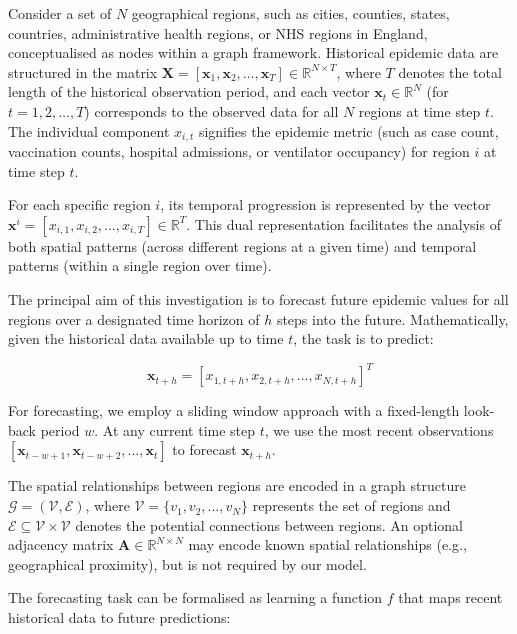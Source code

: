 \documentclass[a4paper,fleqn]{cas-dc}
\begin{document}
Consider a set of $N$ geographical regions, such as cities, counties, states, countries, administrative health regions, or NHS regions in England, conceptualised as nodes within a graph framework. Historical epidemic data are structured in the matrix $\mathbf{X} = [\mathbf{x}_1, \mathbf{x}_2, \ldots, \mathbf{x}_T] \in \mathbb{R}^{N \times T}$, where $T$ denotes the total length of the historical observation period, and each vector $\mathbf{x}_t \in \mathbb{R}^N$ (for $t = 1, 2, \ldots, T$) corresponds to the observed data for all $N$ regions at time step $t$. The individual component $x_{i,t}$ signifies the epidemic metric (such as case count, vaccination counts, hospital admissions, or ventilator occupancy) for region $i$ at time step $t$.

For each specific region $i$, its temporal progression is represented by the vector $\mathbf{x}^i = [x_{i,1}, x_{i,2}, \ldots, x_{i,T}] \in \mathbb{R}^T$. This dual representation facilitates the analysis of both spatial patterns (across different regions at a given time) and temporal patterns (within a single region over time).

The principal aim of this investigation is to forecast future epidemic values for all regions over a designated time horizon of $h$ steps into the future. Mathematically, given the historical data available up to time $t$, the task is to predict:

\begin{equation}
\mathbf{x}_{t+h} = [x_{1,t+h}, x_{2,t+h}, \ldots, x_{N,t+h}]^T
\end{equation}

For forecasting, we employ a sliding window approach with a fixed-length look-back period $w$. At any current time step $t$, we use the most recent observations $[\mathbf{x}_{t-w+1}, \mathbf{x}_{t-w+2}, \ldots, \mathbf{x}_t]$ to forecast $\mathbf{x}_{t+h}$.

The spatial relationships between regions are encoded in a graph structure $\mathcal{G} = (\mathcal{V}, \mathcal{E})$, where $\mathcal{V} = \{v_1, v_2, \ldots, v_N\}$ represents the set of regions and $\mathcal{E} \subseteq \mathcal{V} \times \mathcal{V}$ denotes the potential connections between regions. An optional adjacency matrix $\mathbf{A} \in \mathbb{R}^{N \times N}$ may encode known spatial relationships (e.g., geographical proximity), but is not required by our model.

The forecasting task can be formalised as learning a function $f$ that maps recent historical data to future predictions:
\end{document}
